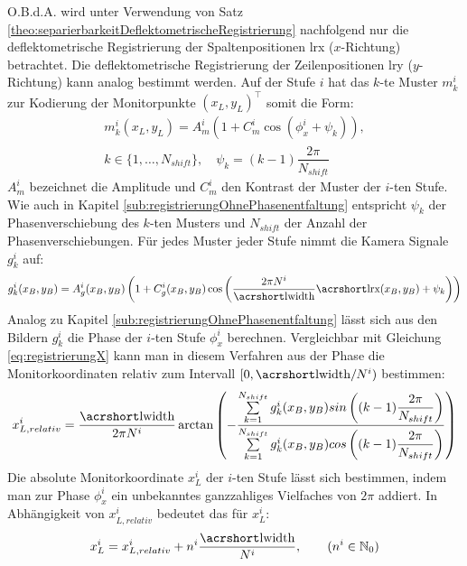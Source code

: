 \p
O.B.d.A. wird unter Verwendung von Satz \ref{theo:separierbarkeitDeflektometrischeRegistrierung} nachfolgend nur die deflektometrische Registrierung der Spaltenpositionen \acrshort{lrx} ($x$-Richtung) betrachtet.
Die deflektometrische Registrierung der Zeilenpositionen \acrshort{lry} ($y$-Richtung) kann analog bestimmt werden.
Auf der Stufe $i$ hat das $k$-te Muster $m_k^i$ zur Kodierung der Monitorpunkte $(x_L, y_L)^\top$ somit die Form:
%
\begin{equation}\label{eq:monitormuster_mehrstufig}
	\begin{gathered}	
		m_k^i(x_L,y_L) = A_m^i \left(1 + C_m^i \cos \left(\phi_x^i + \psi_k\right)\right),\\
		k \in \lbrace 1,\ldots,N_{shift}\rbrace,
		\quad
		\psi_k = (k - 1)\dfrac{2\pi}{N_{shift}}
	\end{gathered}
\end{equation}
%
$A_m^i$ bezeichnet die Amplitude und $C_m^i$ den Kontrast der Muster der $i$-ten Stufe.
Wie auch in Kapitel \ref{sub:registrierungOhnePhasenentfaltung} entspricht $\psi_k$ der Phasenverschiebung des $k$-ten Musters und $N_{shift}$ der Anzahl der Phasenverschiebungen.
Für jedes Muster jeder Stufe nimmt die Kamera Signale $g_k^i$ auf:
%
\begin{equation}\label{eq:kamerabild_mehrstufig}
	g_k^i(x_B, y_B) = A_g^i(x_B, y_B) \left(1 + C_g^i(x_B, y_B) \cos \left(\dfrac{2\pi N^i}{\acrshortmath{lwidth}}\acrshortmath{lrx}(x_B, y_B) + \psi_k\right)\right)
\end{equation}
%
Analog zu Kapitel \ref{sub:registrierungOhnePhasenentfaltung} lässt sich aus den Bildern $g_k^i$ die Phase der $i$-ten Stufe $\phi_x^i$ berechnen.
Vergleichbar mit Gleichung \ref{eq:registrierungX} kann man in diesem Verfahren aus der Phase die Monitorkoordinaten relativ zum Intervall $[0,\acrshortmath{lwidth}/N^i)$ bestimmen:
%
\begin{equation}\label{eq:registrierungX_relativ}
	x_{L,relativ}^i =
	\dfrac{\acrshortmath{lwidth}}{2\pi N^i}
	\arctan 
	\left( 
		-\dfrac
		{\sum\limits_{k=1}^{N_{shift}} g_k^i(x_B, y_B) sin\left((k - 1)\dfrac{2\pi}{N_{shift}}\right)}
		{\sum\limits_{k=1}^{N_{shift}} g_k^i(x_B, y_B) cos\left((k - 1)\dfrac{2\pi}{N_{shift}}\right)}
	\right)
\end{equation}
%
Die absolute Monitorkoordinate $x_L^i$ der $i$-ten Stufe lässt sich bestimmen, indem man zur Phase $\phi_x^i$ ein unbekanntes ganzzahliges Vielfaches von $2\pi$ addiert.
In Abhängigkeit von $x_{L,relativ}^i$ bedeutet das für $x_L^i$:
%
\begin{equation}\label{eq:registrierungX_absolut}
	x_L^i = x_{L,relativ}^i + n^i \dfrac{\acrshortmath{lwidth}}{N^i},
	\qquad
	(n^i \in \mathbb{N}_0)
\end{equation}
